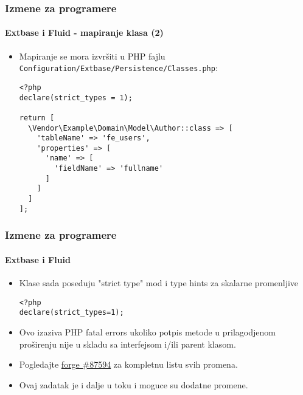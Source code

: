 
\begin{frame}[fragile]
	\frametitle{Izmene za programere}
	\framesubtitle{Extbase i Fluid - mapiranje klasa (2)}

	\lstset{basicstyle=\tiny\ttfamily}

	\begin{itemize}
		\item Mapiranje se mora izvršiti u PHP fajlu \texttt{Configuration/Extbase/Persistence/Classes.php}:

\begin{lstlisting}
<?php
declare(strict_types = 1);

return [
  \Vendor\Example\Domain\Model\Author::class => [
    'tableName' => 'fe_users',
    'properties' => [
      'name' => [
        'fieldName' => 'fullname'
      ]
    ]
  ]
];
\end{lstlisting}

	\end{itemize}

\end{frame}


\begin{frame}[fragile]
	\frametitle{Izmene za programere}
	\framesubtitle{Extbase i Fluid}

	\lstset{basicstyle=\smaller\ttfamily}

	\begin{itemize}
		\item Klase sada poseduju "strict type" mod i type hints za skalarne promenljive

\begin{lstlisting}
<?php
declare(strict_types=1);
\end{lstlisting}

		\item Ovo izaziva PHP fatal errors ukoliko potpis metode u prilagodjenom
			proširenju nije u skladu sa interfejsom i/ili parent klasom.


		\item Pogledajte \href{https://forge.typo3.org/issues/87594}{forge \#87594}
			za kompletnu listu svih promena.

		\item Ovaj zadatak je i dalje u toku i moguce su dodatne promene.

	\end{itemize}

\end{frame}

